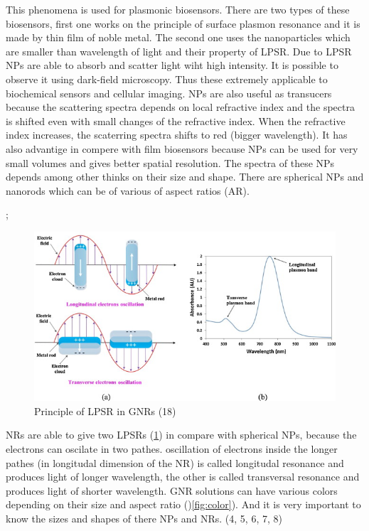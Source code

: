 \documentclass[a4paper,12pt]{article}   %
\numberwithin{equation}{section}        %
\begin{document}
        This phenomena is used for plasmonic biosensors. There are two types of these biosensors, first one works on the principle of surface plasmon resonance and
        it is made by thin film of noble metal. The second one uses the nanoparticles which are smaller than wavelength of light and their property of LPSR.
        Due to LPSR NPs are able to absorb and scatter light wiht high intensity. It is possible to observe it using dark-field microscopy. Thus these extremely
        applicable to biochemical sensors and cellular imaging. NPs are also useful as transucers because the scattering spectra depends on local refractive index
        and the spectra is shifted even with small changes of the refractive index. When the refractive index increases, the scaterring spectra shifts to red (bigger wavelength).
        It has also advantige in compere with film biosensors because NPs can be used for very small volumes and gives better spatial resolution.
        The spectra of these NPs depends among other thinks on their size and shape. There are spherical NPs and nanorods which can be of various of aspect ratios (AR).

;       \begin{figure}
            \includegraphics[width=\linewidth]{GNR.jpg}
            \caption{Principle of LPSR in GNRs (18)}
            \label{fig:GNR}
        \end{figure}

        NRs are able to give two LPSRs (\ref{fig:GNR}) in compare with spherical NPs, because the electrons can oscilate in two pathes. oscillation of electrons inside the longer pathes
        (in longitudal dimension of the NR) is called longitudal resonance and produces light of longer wavelength, the other is called transversal resonance and
        produces light of shorter wavelength. GNR solutions can have various colors depending on their size and aspect ratio ()\ref{fig:color}).
        And it is very important to know the sizes and shapes of there NPs and NRs.
        (4, 5, 6, 7, 8)
\end{document}
